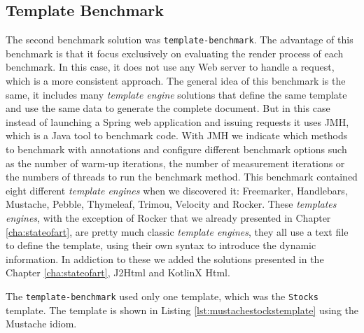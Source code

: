 \subsection{Template Benchmark}
\label{sec:templatebenchmark}

The second benchmark solution was \texttt{template-benchmark}\cite{templatebenchmark}. The advantage of this benchmark is that it focus exclusively on evaluating the render process of each benchmark. In this case, it does not use any Web server to handle a request, which is a more consistent approach. The general idea of this benchmark is the same, it includes many \textit{template engine} solutions that define the same template and use the same data to generate the complete document. But in this case instead of launching a Spring web application and issuing requests it uses \ac{JMH}\cite{jmh}, which is a Java tool to benchmark code. With \ac{JMH} we indicate which methods to benchmark with annotations and configure different benchmark options such as the number of warm-up iterations, the number of measurement iterations or the numbers of threads to run the benchmark method. This benchmark contained eight different \textit{template engines} when we discovered it: Freemarker\cite{freemarker}, Handlebars\cite{handlebars}, Mustache\cite{mustache}, Pebble\cite{pebble}, Thymeleaf\cite{thymeleaf}, Trimou\cite{trimou}, Velocity\cite{velocity} and Rocker\cite{rocker}. These \textit{templates engines}, with the exception of Rocker that we already presented in Chapter \ref{cha:stateofart}, are pretty much classic \textit{template engines}, they all use a text file to define the template, using their own syntax to introduce the dynamic information. In addiction to these we added the solutions presented in the Chapter \ref{cha:stateofart}, J2Html and KotlinX Html. 

\noindent
The \texttt{template-benchmark} used only one template, which was the \texttt{Stocks} template. The template is shown in Listing \ref{lst:mustachestockstemplate} using the Mustache idiom.

\bigskip


